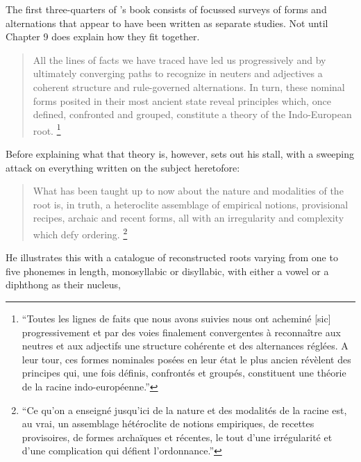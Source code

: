 \documentclass[output=paper]{langscibook}
\begin{document}
The first three-quarters of {\Benveniste}'s book consists of focussed surveys of forms and alternations that appear to have been written as separate studies. Not until Chapter 9 does {\Benveniste} explain how they fit together.

\begin{quotation}
All the lines of facts we have traced have led us progressively and by ultimately converging paths to recognize in neuters and adjectives a coherent structure and rule-governed alternations. In turn, these nominal forms posited in their most ancient state reveal principles which, once defined, confronted and grouped, constitute a theory of the Indo-European root. \citep[147]{Benveniste1935}\footnote{``Toutes les lignes de faits que nous avons suivies nous ont acheminé [sic] progressivement et par des voies finalement convergentes à reconnaître aux neutres et aux adjectifs une structure cohérente et des alternances réglées. A leur tour, ces formes nominales posées en leur état le plus ancien révèlent des principes qui, une fois définis, confrontés et groupés, constituent une théorie de la racine indo-européenne.''}
\end{quotation}

Before explaining what that theory is, however, {\Benveniste} sets out his  stall, with a sweeping attack on everything written on the subject heretofore:

\begin{quotation}
What has been taught up to now about the nature and modalities of the root is, in truth, a heteroclite assemblage of empirical notions, provisional recipes, archaic and recent forms, all with an irregularity and complexity which defy ordering. \citep[147]{Benveniste1935}\footnote{``Ce qu'on a enseigné jusqu'ici de la nature et des modalités de la racine est, au vrai, un assemblage hétéroclite de notions empiriques, de recettes provisoires, de formes archaïques et récentes, le tout d’une irrégularité et d’une complication qui défient l’ordonnance.''}
\end{quotation}

He illustrates this with a catalogue of reconstructed roots varying from one to five phonemes in length, monosyllabic or disyllabic, with either a vowel or a diphthong as their nucleus, 
\end{document}
